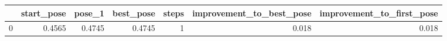 \begin{tabular}{lrrrrrr}
\toprule
{} &  start\_pose &  pose\_1 &  best\_pose &  steps &  improvement\_to\_best\_pose &  improvement\_to\_first\_pose \\
\midrule
0 &      0.4565 &  0.4745 &     0.4745 &      1 &                     0.018 &                      0.018 \\
\bottomrule
\end{tabular}
